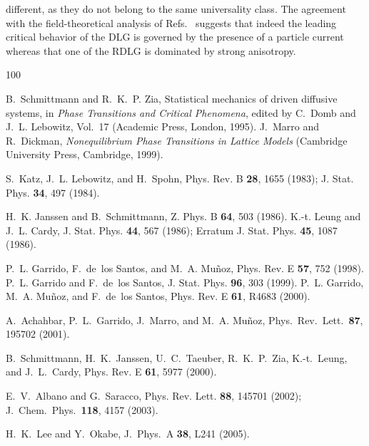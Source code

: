 \documentclass[aps,prl,twocolumn,floatfix,amssymb,showpacs]{revtex4}
\begin{document}
  different, as
  they do not belong to the same universality class. The agreement with
  the field-theoretical analysis of
  Refs.~\cite{Janssen86a,RDLG,two-reservoirs} suggests that indeed the
  leading critical behavior of the DLG is governed by
  the presence of a particle 
  current whereas that one of the RDLG is dominated by strong anisotropy.
  \begin{thebibliography}{100}
  
  B.~Schmittmann and R.~K.~P. Zia,
  Statistical mechanics of driven diffusive systems,
  in {\em Phase Transitions and Critical Phenomena}, 
  edited by C.~Domb and J.~L. Lebowitz, Vol.~17 
  (Academic Press, London, 1995).
  J.~Marro and R.~Dickman, 
  {\em Nonequilibrium Phase Transitions in Lattice Models} 
  (Cambridge University Press, Cambridge, 1999).

  S.~Katz, J.~L. Lebowitz, and H.~Spohn, 
  Phys. Rev. B {\bf 28}, 1655 (1983); 
  J. Stat. Phys. {\bf 34}, 497 (1984).

  H.~K. Janssen and B.~Schmittmann,
  Z. Phys. B {\bf 64}, 503 (1986).
  K.-t. Leung and J.~L. Cardy,
  J. Stat. Phys. {\bf 44}, 567 (1986);
  Erratum J. Stat. Phys. {\bf 45}, 1087 (1986).

  P.~L. Garrido, F.~de~los Santos, and M.~A. Mu{\~n}oz,
  Phys. Rev. E {\bf 57}, 752 (1998).
  P.~L. Garrido and F.~de~los Santos,
  J. Stat. Phys. {\bf 96}, 303 (1999).
  P.~L. Garrido, M.~A. Mu{\~n}oz, and F.~de~los Santos,
  Phys. Rev. E {\bf 61}, R4683 (2000).

  A.~Achahbar, P.~L.~Garrido, J.~Marro, and M.~A. Mu{\~n}oz, 
  Phys.\ Rev.\ Lett.\ {\bf 87}, 195702 (2001).

  B.~Schmittmann, H.~K.~Janssen, U.~C.~Taeuber, R.~K.~P.~Zia, K.-t.~Leung, and
  J.~L.~Cardy,
  Phys. Rev. E {\bf 61},  5977 (2000).

  E.~V.~Albano and G.~Saracco,
  Phys. Rev. Lett. {\bf 88}, 145701 (2002);
  J.\ Chem.\ Phys.\ {\bf 118}, 4157 (2003).

  H.~K.~Lee and Y.~Okabe,
  J.\ Phys.\ A {\bf 38}, L241 (2005).


\end{thebibliography}
\end{document}

